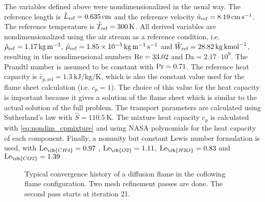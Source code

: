 The variables defined above were nondimensionalized in the usual way. The reference length is $\hat L_{\text{ref}} =  \SI{0.635}{\centi \meter}$ and the reference velocity $\hat u_{\text{ref}} =\SI{8.19}{\centi \meter \per \second}$. The reference temperature is $\hat T_{\text{ref}} =\SI{300}{K}$.  All derived variables are nondimensionalized using the air stream as a reference condition, i.e. $\hat \rho_{\text{ref}} = \SI{1.17}{\kilo \gram \per \cubic \meter}$, $\hat \mu_{\text{ref}} = \SI{1.85e-5}{\kilo \gram \per \meter \per \second}$ and $\hat W_{\text{ref}} = \SI{28.82}{\kilo \gram \per \kilo\mole}$, resulting in the nondimensional numbers $\text{Re} = 33.02$ and $\text{Da} = 2.17\cdot 10^9$. The Prandtl number is assumed to be constant with $\text{Pr} = 0.71$. The reference heat capacity is $\hat{c}_{p,\text{ref}}= \SI{1.3}{\kilo \joule \per \kilo \gram \per \kelvin}$, which is also the constant value used for the flame sheet calculation (i.e. $c_p = 1$). The choice of this value for the heat capacity is important because it gives a solution of the flame sheet which is similar to the actual solution of the full problem. The transport parameters are calculated using Sutherland's law with $\hat{S} = \SI{110.5}{\kelvin}$. The mixture heat capacity $c_p$ is calculated with \cref{eq:nondim_cpmixture} and using NASA polynomials for the heat capacity of each component. Finally, a nonunity but constant Lewis number formulation is used, with
$\Lewis_{\ch{CH4}} =  0.97 $ , $\Lewis_{\ch{O2}} = 1.11 $, $\Lewis_{\ch{H2O}} = 0.83 $ and $\Lewis_{\ch{CO2}} = 1.39 $ \parencite{smookePremixedNonpremixedTest1991}
\begin{figure}[b!]
	\centering
	\caption{Typical convergence history of a diffusion flame in the coflowing flame configuration. Two mesh refinement passes are done. The second pass starts at iteration 21. }
	\label{fig:CoFlow_ConvergenceStory}
\end{figure}
